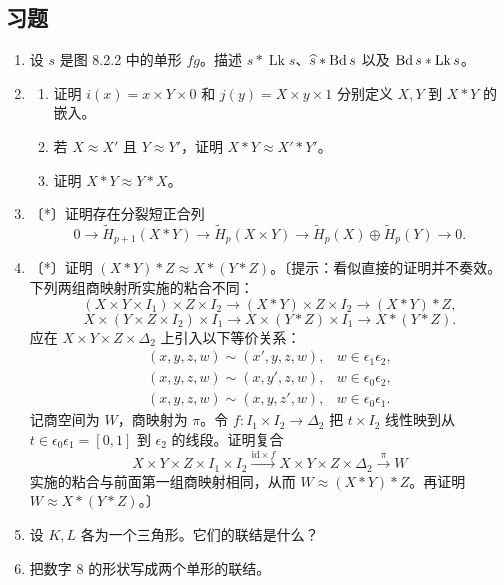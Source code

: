 \subsection*{习题}
\begin{enumerate}
\item 设 $s$ 是图 8.2.2 中的单形 $fg$。描述 $\widehat s*\operatorname{Lk}s$、$\widehat s*\operatorname{Bd} s$ 以及 $\operatorname{Bd} s*\operatorname{Lk}s$。
\item \begin{enumerate}[label=(\alph*)]
\item 证明 $i(x)=x\times Y\times0$ 和 $j(y)=X\times y\times1$ 分别定义 $X,Y$ 到 $X*Y$ 的嵌入。
\item 若 $X\approx X'$ 且 $Y\approx Y'$，证明 $X*Y\approx X'*Y'$。
\item 证明 $X*Y\approx Y*X$。
\end{enumerate}
\item 〔*〕证明存在分裂短正合列
\[0\to\widetilde H_{p+1}(X*Y)\to\widetilde H_p(X\times Y)
\to\widetilde H_p(X)\oplus\widetilde H_p(Y)\to0.\]
\item 〔*〕证明 $(X*Y)*Z\approx X*(Y*Z)$。〔提示：看似直接的证明并不奏效。下列两组商映射所实施的粘合不同：
\[
(X\times Y\times I_1)\times Z\times I_2\to(X*Y)\times Z\times I_2\to(X*Y)*Z,
\]
\[
X\times(Y\times Z\times I_2)\times I_1\to X\times(Y*Z)\times I_1\to X*(Y*Z).
\]
应在 $X\times Y\times Z\times\Delta_2$ 上引入以下等价关系：
\[
\begin{array}{ll}
(x,y,z,w)\sim(x',y,z,w),&w\in\epsilon_1\epsilon_2,\\
(x,y,z,w)\sim(x,y',z,w),&w\in\epsilon_0\epsilon_2,\\
(x,y,z,w)\sim(x,y,z',w),&w\in\epsilon_0\epsilon_1.
\end{array}
\]
记商空间为 $W$，商映射为 $\pi$。令 $f:I_1\times I_2\to\Delta_2$ 把 $t\times I_2$ 线性映到从 $t\in\epsilon_0\epsilon_1=[0,1]$ 到 $\epsilon_2$ 的线段。证明复合
\[
X\times Y\times Z\times I_1\times I_2
\xrightarrow{\mathrm{id}\times f}X\times Y\times Z\times\Delta_2\xrightarrow{\pi}W
\]
实施的粘合与前面第一组商映射相同，从而 $W\approx(X*Y)*Z$。再证明 $W\approx X*(Y*Z)$。〕
\item 设 $K,L$ 各为一个三角形。它们的联结是什么？
\item 把数字 $8$ 的形状写成两个单形的联结。
\end{enumerate}
